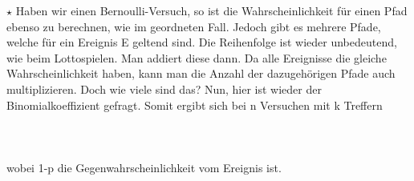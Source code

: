 		\(\star\) Haben wir einen Bernoulli-Versuch, so ist die Wahrscheinlichkeit für
		einen Pfad ebenso zu berechnen, wie im geordneten Fall. Jedoch gibt es mehrere
		Pfade, welche für ein Ereignis E geltend sind. Die Reihenfolge ist wieder
		unbedeutend, wie beim Lottospielen. Man addiert diese dann. Da alle Ereignisse
		die gleiche Wahrscheinlichkeit haben, kann man die Anzahl der dazugehörigen
		Pfade auch multiplizieren. Doch wie viele sind das? Nun, hier ist wieder der
		Binomialkoeffizient gefragt. Somit ergibt sich bei n Versuchen mit k Treffern
		\\ \\
		\formel{\[P(X=k)=B(k,p,n)=\binom{n}{k}\cdot p^k\cdot (1-p)^{n-k}\]}
		\\ \\
		wobei 1-p die Gegenwahrscheinlichkeit vom Ereignis ist.
